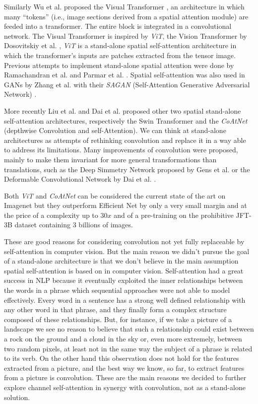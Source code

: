 \documentclass[fleqn,10pt]{SelfArx}
\begin{document}
Similarly Wu et al. proposed the Visual Transformer \cite{wu2020visual}, an architecture in which many ``tokens'' (i.e., image sections derived from a spatial attention module) are feeded into a transformer. The entire block is integrated in a convolutional network.
The Visual Transformer is inspired by \textit{ViT}, the Vision Transformer by Dosovitskiy et al. \cite{dosovitskiy2020image}, \textit{ViT} is a stand-alone spatial self-attention architecture in which the transformer's inputs are patches extracted from the tensor image. Previous attempts to implement stand-alone spatial attention were done by Ramachandran et al. \cite{ramachandran2019stand} and Parmar et al. \cite{parmar2018image}. Spatial self-attention was also used in GANs by Zhang et al. with their \textit{SAGAN} (Self-Attention Generative Adversarial Network) \cite{zhang2019self}.

More recently Liu et al. and Dai et al. proposed other two spatial stand-alone self-attention architectures, respectively the Swin Transformer \cite{liu2021swin} and the \textit{CoAtNet} \cite{dai2021coatnet} (depthwise Convolution and self-Attention). We can think at stand-alone architectures as attempts of rethinking convolution and replace it in a way able to address its limitations. Many improvements of convolution were proposed, mainly to make them invariant for more general transformations than translations, such as the Deep Simmetry Network proposed by Gens et al. \cite{gens2014deep} or the Deformable Convolutional Network by Dai et al. \cite{dai2017deformable}.

Both \textit{ViT} and \textit{CoAtNet} can be considered the current state of the art on Imagenet but they outperform Efficient Net by only a very small margin \cite{pham2021meta} and at the price of a complexity up to $30x$ and of a pre-training on the prohibitive JFT-3B dataset containing 3 billions of images.

These are good reasons for considering convolution not yet fully replaceable by self-attention in computer vision. But the main reason we didn't pursue the goal of a stand-alone architecture is that we don't believe in the main assumption spatial self-attention is based on in computer vision. Self-attention had a great success in NLP because it eventually exploited the inner relationships between the words in a phrase which sequential approaches were not able to model effectively. Every word in a sentence has a strong well defined relationship with any other word in that phrase, and they finally form a complex structure composed of these relationships. But, for instance, if we take a picture of a landscape we see no reason to believe that such a relationship could exist between a rock on the ground and a cloud in the sky or, even more extremely, between two random pixels, at least not in the same way the subject of a phrase is related to its verb.
On the other hand this observation does not hold for the features extracted from a picture, and the best way we know, so far, to extract features from a picture is convolution. These are the main reasons we decided to further explore channel self-attention in synergy with convolution, not as a stand-alone solution.
\end{document}

